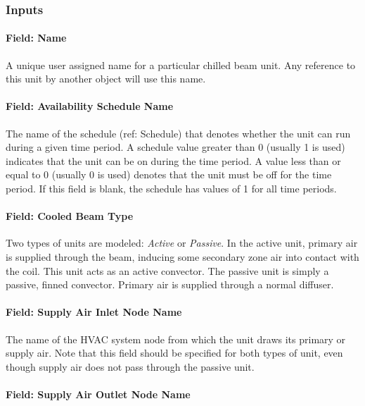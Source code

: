 \subsubsection{Inputs}\label{inputs-11-000}

\paragraph{Field: Name}\label{field-name-11-000}

A unique user assigned name for a particular chilled beam unit. Any reference to this unit by another object will use this name.

\paragraph{Field: Availability Schedule Name}\label{field-availability-schedule-name-10}

The name of the schedule (ref: Schedule) that denotes whether the unit can run during a given time period. A schedule value greater than 0 (usually 1 is used) indicates that the unit can be on during the time period. A value less than or equal to 0 (usually 0 is used) denotes that the unit must be off for the time period. If this field is blank, the schedule has values of 1 for all time periods.

\paragraph{Field: Cooled Beam Type}\label{field-cooled-beam-type}

Two types of units are modeled: \emph{Active} or \emph{Passive}. In the active unit, primary air is supplied through the beam, inducing some secondary zone air into contact with the coil. This unit acts as an active convector. The passive unit is simply a passive, finned convector. Primary air is supplied through a normal diffuser.

\paragraph{Field: Supply Air Inlet Node Name}\label{field-supply-air-inlet-node-name-3}

The name of the HVAC system node from which the unit draws its primary or supply air. Note that this field should be specified for both types of unit, even though supply air does not pass through the passive unit.

\paragraph{Field: Supply Air Outlet Node Name}\label{field-supply-air-outlet-node-name}

